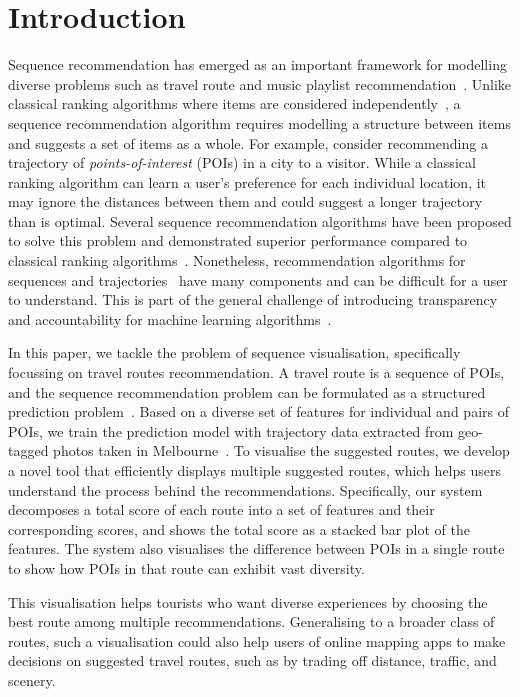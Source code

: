 
\section{Introduction}
Sequence recommendation has emerged as an important framework for modelling diverse problems such as travel route and music playlist recommendation~\cite{chen2017SR}. 
Unlike classical ranking algorithms where items are considered independently~\cite{koren2009matrix},
a sequence recommendation algorithm requires modelling a structure between items and suggests a set of items as a whole. 
For example, consider recommending a trajectory of \emph{points-of-interest} (POIs) in a city to a visitor. 
While a classical ranking algorithm can learn a user's preference for each individual location, it may ignore the distances between them and could suggest a longer trajectory than is optimal. 
Several sequence recommendation algorithms have been proposed to solve this problem and demonstrated superior performance compared to classical ranking algorithms~\cite{ijcai15,chen2017SR}. 
Nonetheless, recommendation algorithms for sequences and trajectories~\cite{chen2016learning,chen2017SR} have many components and can be difficult for a user to understand. This is part of the general challenge of introducing transparency and accountability for machine learning algorithms~\cite{fatml}. 

In this paper, we tackle the problem of sequence visualisation, specifically focussing on travel routes recommendation. 
A travel route is a sequence of POIs, and the sequence recommendation problem can be formulated as a structured prediction problem~\cite{chen2017SR}.
Based on a diverse set of features for individual and pairs of POIs, we train the prediction model with trajectory data extracted from geo-tagged photos taken in Melbourne~\cite{chen2016learning}. 
To visualise the suggested routes, we develop a novel tool that efficiently displays multiple suggested routes, which helps users understand the process behind the recommendations.
Specifically, our system decomposes a total score of each route into a set of features and their corresponding scores, and shows the total score as a stacked bar plot of the features.
The system also visualises the difference between POIs in a single route to show how POIs in that route can exhibit vast diversity. 

This visualisation helps tourists who want %
diverse experiences by choosing the best route among multiple recommendations. %
Generalising to a broader class of routes, such a visualisation could also help users of online mapping apps to make decisions on suggested travel routes, such as by trading off distance, traffic, and scenery. 
